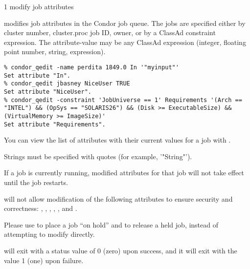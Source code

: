 \begin{ManPage}{\label{man-condor-qedit}}{1}
{modify job attributes}
\Synopsis {}
\Arg{\Dots}


\Description

 modifies job attributes in the Condor job queue.  The
jobs are specified either by cluster number, cluster.proc job ID,
owner, or by a ClassAd constraint expression.  The attribute-value may
be any ClassAd expression (integer, floating point number, string,
expression).

\begin{Options}
\end{Options}

\Examples
\begin{verbatim}
% condor_qedit -name perdita 1849.0 In '"myinput"'
Set attribute "In".
% condor_qedit jbasney NiceUser TRUE
Set attribute "NiceUser".
% condor_qedit -constraint 'JobUniverse == 1' Requirements '(Arch == "INTEL") && (OpSys == "SOLARIS26") && (Disk >= ExecutableSize) && (VirtualMemory >= ImageSize)'
Set attribute "Requirements".
\end{verbatim}

\GenRem
You can view the list of attributes with their current values for a
job with  .

Strings must be specified with quotes (for example, '"String"').

If a job is currently running, modified attributes for that job will
not take effect until the job restarts.

 will not allow modification of the following
attributes to ensure security and correctness: ,
, , , , and
.

Please use  to place a job ``on hold'' and
 to release a held job, instead of attempting to
modify  directly.

\ExitStatus

 will exit with a status value of 0 (zero) upon success,
and it will exit with the value 1 (one) upon failure.

\end{ManPage}
